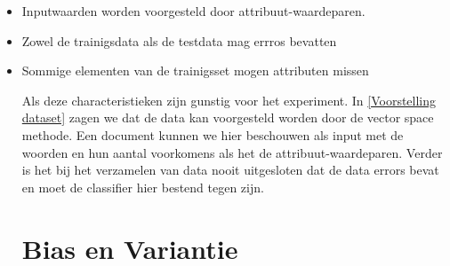 \begin{itemize}
  \item{Inputwaarden worden voorgesteld door attribuut-waardeparen.}
  \item{Zowel de trainigsdata als de testdata mag errros bevatten}
  \item{Sommige elementen van de trainigsset mogen attributen missen}

Als deze characteristieken zijn gunstig voor het experiment. In \ref{Voorstelling dataset} zagen we dat de data kan voorgesteld worden door de vector space methode. Een document kunnen we hier beschouwen als input met de woorden en hun aantal voorkomens als het de attribuut-waardeparen. Verder is het bij het verzamelen van data nooit uitgesloten dat de data errors bevat en moet de classifier hier bestend tegen zijn.

\section{Bias en Variantie}\label{Bias en Variantie}


\end{itemize}
